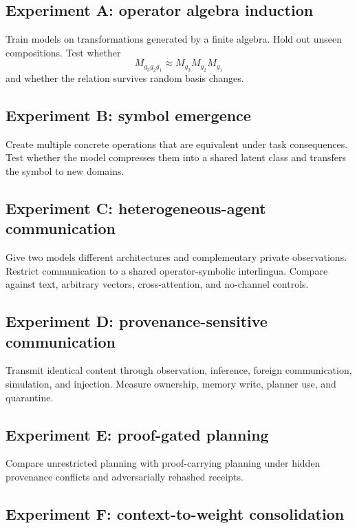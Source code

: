 \documentclass[11pt]{article}
\theoremstyle{definition}
\theoremstyle{remark}
\begin{document}
\subsection{Experiment A: operator algebra induction}

Train models on transformations generated by a finite algebra. Hold out unseen compositions. Test whether
\[
M_{g_3g_2g_1}
\approx
M_{g_3}M_{g_2}M_{g_1}
\]
and whether the relation survives random basis changes.

\subsection{Experiment B: symbol emergence}

Create multiple concrete operations that are equivalent under task consequences. Test whether the model compresses them into a shared latent class and transfers the symbol to new domains.

\subsection{Experiment C: heterogeneous-agent communication}

Give two models different architectures and complementary private observations. Restrict communication to a shared operator-symbolic interlingua. Compare against text, arbitrary vectors, cross-attention, and no-channel controls.

\subsection{Experiment D: provenance-sensitive communication}

Transmit identical content through observation, inference, foreign communication, simulation, and injection. Measure ownership, memory write, planner use, and quarantine.

\subsection{Experiment E: proof-gated planning}

Compare unrestricted planning with proof-carrying planning under hidden provenance conflicts and adversarially rehashed receipts.

\subsection{Experiment F: context-to-weight consolidation}
\end{document}
